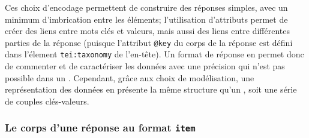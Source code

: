Ces choix d'encodage permettent de construire des réponses simples, avec un minimum d'imbrication entre les éléments; l'utilisation d'attributs permet de créer des liens entre mots clés et valeurs, mais aussi des liens entre différentes parties de la réponse (puisque l'attribut \texttt{@key} du corps de la réponse est défini dans l'élement \texttt{tei:taxonomy} de l'en-tête). Un format de réponse en \tei{} permet donc de commenter et de caractériser les données avec une précision qui n'est pas possible dans un \json{}. Cependant, grâce aux choix de modélisation, une représentation des données en \tei{} présente la même structure qu'un \json{}, soit une série de couples clés-valeurs.

\subsubsection{Le corps d'une réponse au format \texttt{item}}
